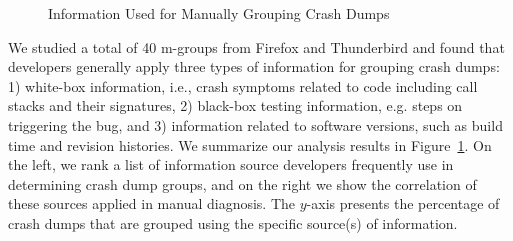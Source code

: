 \documentclass{llncs}
\begin{document}
\begin{figure}
\caption{Information Used for Manually Grouping Crash Dumps~\label{fig:stack}}

\end{figure}

We studied a total of 40 m-groups from Firefox and Thunderbird and found that developers generally apply three types of information for grouping crash dumps: 1) white-box information, i.e., crash symptoms related to code including call stacks and their signatures, 2) black-box testing information, e.g. steps on triggering the bug, and 3) information related to software versions, such as build time and revision histories. We summarize our analysis results in Figure~\ref{fig:stack}. On the left, we rank a list of information source developers frequently use in determining crash dump groups, and on the right we show the correlation of these sources applied in manual diagnosis. The $y$-axis presents the percentage of crash dumps that are grouped using the specific source(s) of information.
\end{document}
